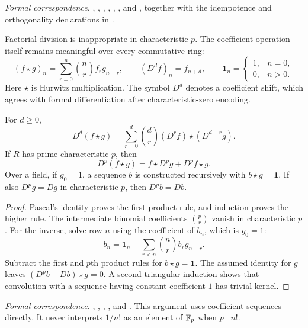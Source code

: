 \begingroup\small\raggedright
\noindent\emph{Formal correspondence.}
, ,
, ,
, ,
and , together with the idempotence and
orthogonality declarations in .
\par\endgroup

Factorial division is inappropriate in characteristic $p$. The coefficient
operation itself remains meaningful over every commutative ring:
\[
(f\star g)_n=\sum_{r=0}^{n}\binom nr f_r g_{n-r},\qquad
(D^d f)_n=f_{n+d},\qquad \mathbf1_n=\begin{cases}1,&n=0,\\0,&n>0.\end{cases}
\]
Here $\star$ is Hurwitz multiplication. The symbol $D^d$ denotes a coefficient
shift, which agrees with formal differentiation after characteristic-zero
encoding.

\begin{theorem}
\label{thm:hurwitz-product}
For $d\geq0$,
\[
D^d(f\star g)=\sum_{r=0}^{d}\binom dr(D^r f)\star(D^{d-r}g).
\]
If $R$ has prime characteristic $p$, then
\[
D^p(f\star g)=f\star D^p g+D^p f\star g.
\]
Over a field, if $g_0=1$, a sequence $b$ is constructed recursively with
$b\star g=\mathbf1$. If also $D^p g=Dg$ in characteristic $p$, then
$D^p b=Db$.
\end{theorem}

\begin{proof}
Pascal's identity proves the first product rule, and induction proves the
higher rule. The intermediate binomial coefficients $\binom pr$ vanish in
characteristic $p$. For the inverse, solve row $n$ using the coefficient of
$b_n$, which is $g_0=1$:
\[
b_n=\mathbf1_n-\sum_{r<n}\binom nr b_r g_{n-r}.
\]
Subtract the first and $p$th product rules for $b\star g=\mathbf1$.
The assumed identity for $g$ leaves
$(D^p b-Db)\star g=0$. A second triangular induction shows that convolution
with a sequence having constant coefficient $1$ has trivial kernel.
\end{proof}

\begingroup\small\raggedright
\noindent\emph{Formal correspondence.}
, ,
,
, and
.
This argument uses coefficient sequences directly. It never interprets
$1/n!$ as an element of $\mathbb F_p$ when $p\mid n!$.
\par\endgroup

